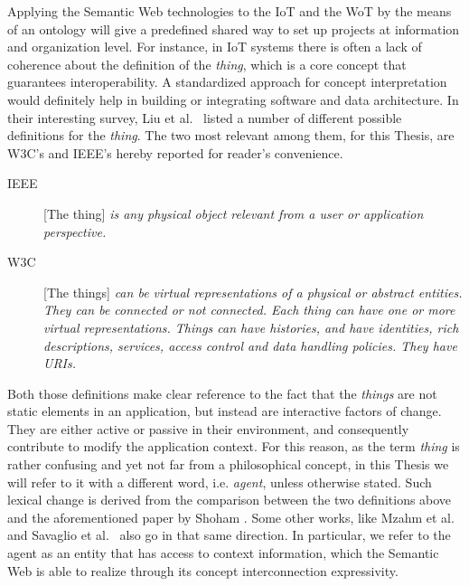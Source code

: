 \documentclass[11pt, twoside, openright]{report}   	%
\begin{document}

Applying the Semantic Web technologies to the IoT and the WoT by the means of an ontology will give a predefined shared way to set up projects at information and organization level. For instance, in IoT systems there is often a lack of coherence about the definition of the \textit{thing}, which is a core concept that guarantees interoperability. A standardized approach for concept interpretation would definitely help in building or integrating software and data architecture. In their interesting survey, Liu et al.~\cite{liu2016comparison} listed a number of different possible definitions for the \textit{thing}. The two most relevant among them, for this Thesis, are W3C's and IEEE's hereby reported for reader's convenience.
\begin{description}
\item[IEEE] [The thing] \textit{is any physical object relevant from a user or application perspective.}

\item[W3C] [The things] \textit{can be virtual representations of a physical or abstract entities. They can be connected or not connected. Each thing can have one or more virtual representations. Things can have histories, and have identities, rich descriptions, services, access control and data handling policies. They have URIs.}
\end{description}

Both those definitions make clear reference to the fact that the \textit{things} are not static elements in an application, but instead are interactive factors of change. They are either active or passive in their environment, and consequently contribute to modify the application context. For this reason, as the term \textit{thing} is rather confusing and yet not far from a philosophical concept, in this Thesis we will refer to it with a different word, i.e. \textit{agent}, unless otherwise stated. Such lexical change is derived from the comparison between the two definitions above and the aforementioned paper by Shoham \cite{shoham1993agent}. Some other works, like Mzahm et al.~\cite{mzahm2014enhancing} and Savaglio et al.~\cite{savaglio2017agent} also go in that same direction. In particular, we refer to the agent as an entity that has access to context information, which the Semantic Web is able to realize through its concept interconnection expressivity.
\end{document}
